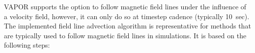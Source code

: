 \documentclass{aa}
\begin{document}

VAPOR supports the option to follow magnetic field lines under the influence of a velocity field, however, it can only do so at timestep cadence (typically 10~sec). The implemented field line advection algorithm is representative for methods that are typically used to follow magnetic field lines in simulations. It is based on the following steps: 
\end{document}
